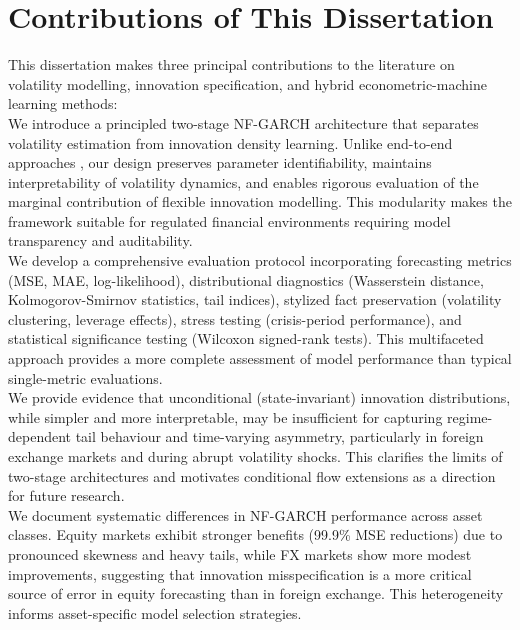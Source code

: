 \documentclass[oneside,12pt]{CUEDthesisPSnPDF}
\newcommand{\parencite}{\citep}
\begin{document}

\section{Contributions of This Dissertation}
\label{sec:contributions}

\noindent
This dissertation makes three principal contributions to the literature on volatility modelling, innovation specification, and hybrid econometric-machine learning methods:\\

We introduce a principled two-stage NF-GARCH architecture that separates volatility estimation from innovation density learning. Unlike end-to-end approaches \parencite{seitz2022garchnf}, our design preserves parameter identifiability, maintains interpretability of volatility dynamics, and enables rigorous evaluation of the marginal contribution of flexible innovation modelling. This modularity makes the framework suitable for regulated financial environments requiring model transparency and auditability.\\
    
We develop a comprehensive evaluation protocol incorporating forecasting metrics (MSE, MAE, log-likelihood), distributional diagnostics (Wasserstein distance, Kolmogorov-Smirnov statistics, tail indices), stylized fact preservation (volatility clustering, leverage effects), stress testing (crisis-period performance), and statistical significance testing (Wilcoxon signed-rank tests). This multifaceted approach provides a more complete assessment of model performance than typical single-metric evaluations.\\
    
We provide evidence that unconditional (state-invariant) innovation distributions, while simpler and more interpretable, may be insufficient for capturing regime-dependent tail behaviour and time-varying asymmetry, particularly in foreign exchange markets and during abrupt volatility shocks. This clarifies the limits of two-stage architectures and motivates conditional flow extensions as a direction for future research.\\

We document systematic differences in NF-GARCH performance across asset classes. Equity markets exhibit stronger benefits (99.9\% MSE reductions) due to pronounced skewness and heavy tails, while FX markets show more modest improvements, suggesting that innovation misspecification is a more critical source of error in equity forecasting than in foreign exchange. This heterogeneity informs asset-specific model selection strategies.\\
    
\end{document}
